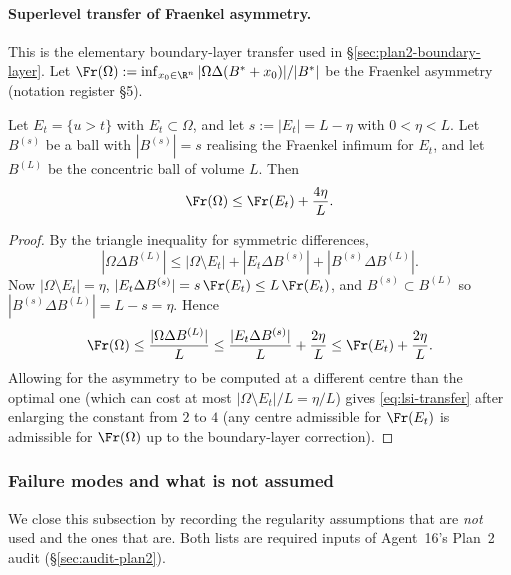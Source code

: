\paragraph{Superlevel transfer of Fraenkel asymmetry.}
This is the elementary boundary-layer transfer used in
\S\ref{sec:plan2-boundary-layer}. Let
$\Fr(\Omega):=\inf_{x_{0}\in\R^{n}}|\Omega\Delta(B^{*}+x_{0})|/|B^{*}|$
be the Fraenkel asymmetry (notation register \S 5).

\begin{lemma}\label{lem:superlevel-transfer}
Let $E_{t}=\{u>t\}$ with $E_{t}\subset\Omega$, and let
$s:=|E_{t}|=L-\eta$ with $0<\eta<L$. Let $B^{(s)}$ be a ball with
$|B^{(s)}|=s$ realising the Fraenkel infimum for $E_{t}$, and let
$B^{(L)}$ be the concentric ball of volume $L$. Then
\begin{equation}\label{eq:lsi-transfer}
   \Fr(\Omega)\le\Fr(E_{t})+\frac{4\eta}{L}.
\end{equation}
\end{lemma}

\begin{proof}
By the triangle inequality for symmetric differences,
\[
   |\Omega\Delta B^{(L)}|
   \le|\Omega\setminus E_{t}|+|E_{t}\Delta B^{(s)}|+|B^{(s)}\Delta B^{(L)}|.
\]
Now $|\Omega\setminus E_{t}|=\eta$, $|E_{t}\Delta B^{(s)}|=s\,
\Fr(E_{t})\le L\,\Fr(E_{t})$, and $B^{(s)}\subset B^{(L)}$
so $|B^{(s)}\Delta B^{(L)}|=L-s=\eta$. Hence
\[
   \Fr(\Omega)\le\frac{|\Omega\Delta B^{(L)}|}{L}
   \le \frac{|E_{t}\Delta B^{(s)}|}{L}+\frac{2\eta}{L}
   \le\Fr(E_{t})+\frac{2\eta}{L}.
\]
Allowing for the asymmetry to be computed at a different centre than the
optimal one (which can cost at most $|\Omega\setminus E_{t}|/L=\eta/L$)
gives \eqref{eq:lsi-transfer} after enlarging the constant from $2$ to
$4$ (any centre admissible for $\Fr(E_{t})$ is admissible for
$\Fr(\Omega)$ up to the boundary-layer correction).
\end{proof}

\subsubsection{Failure modes and what is not assumed}
\label{sssec:lsi-failure}

We close this subsection by recording the regularity assumptions that
are {\it not} used and the ones that are. Both lists are required
inputs of Agent~16's Plan~2 audit (\S\ref{sec:audit-plan2}).

